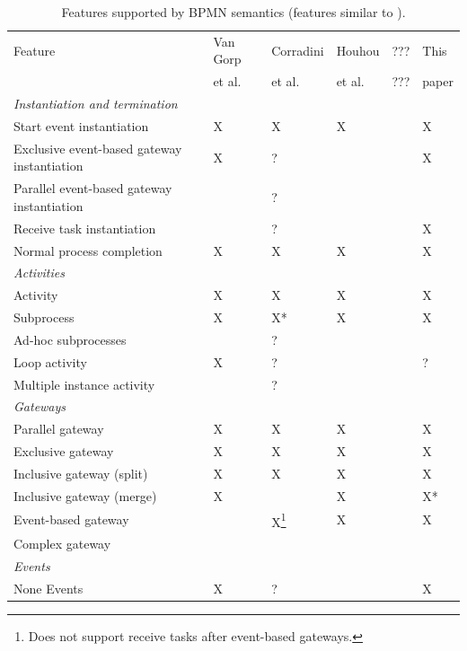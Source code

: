 \documentclass[adraft, copyright, creativecommons]{eptcs} %
\begin{document}
\begin{table}[htbp]
    \caption{Features supported by BPMN semantics (features similar to \cite{vangorpVisualTokenbasedFormalization2013}).}
    \label{tab:supportedFeatures}
    \begin{tabular}{l l l l l l} %
    \hline
      Feature & Van Gorp &  Corradini & Houhou & ??? & This\\
      & et al. \cite{vangorpVisualTokenbasedFormalization2013} & et al. \cite{corradiniFormalApproachAnalysis2021}& et al. \cite{houhouFirstOrderLogicSemantics2019} & ??? & paper\\
      \hline
      \textit{Instantiation and termination} & & &\\
      Start event instantiation & X & X & X & & X\\
      Exclusive event-based gateway instantiation & X & ? & & & X\\
      Parallel event-based gateway instantiation &  & ? & & & \\
      Receive task instantiation &  & ? & & & X\\
      Normal process completion & X & X & X & & X\\
      \textit{Activities} & & & & &\\
      Activity & X & X & X & & X\\
      Subprocess & X & X* & X & & X\\
      Ad-hoc subprocesses &  & ? & & &\\
      Loop activity & X & ? & & & ?\\
      Multiple instance activity &  & ? & & & \\
      \textit{Gateways} & & & & &\\
      Parallel gateway & X & X & X & & X\\
      Exclusive gateway & X & X & X & & X\\
      Inclusive gateway (split) & X & X & X & & X\\
      Inclusive gateway (merge) & X & & X & & X*\\
      Event-based gateway &  & X\footnote{Does not support receive tasks after event-based gateways.} & X & & X\\ %
      Complex gateway & & & & &\\
      \textit{Events} &  &  &  &  & \\
      None Events & X & ? & &  & X\\

\end{tabular}
\end{table}
\end{document}
